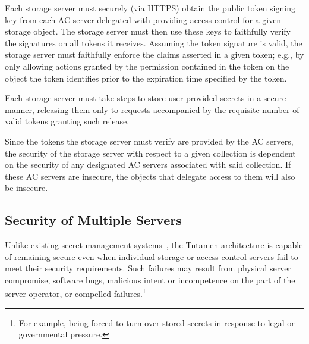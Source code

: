 \begin{packed_desc}
\item[Token Verification:] Each storage server must securely (via
  HTTPS) obtain the public token signing key from each AC server
  delegated with providing access control for a given storage
  object. The storage server must then use these keys to faithfully
  verify the signatures on all tokens it receives. Assuming the token
  signature is valid, the storage server must faithfully enforce the
  claims asserted in a given token; e.g., by only allowing actions
  granted by the permission contained in the token on the object the
  token identifies prior to the expiration time specified by the
  token.
\item[Secure Storage:] Each storage server must take steps to store
  user-provided secrets in a secure manner, releasing them only to
  requests accompanied by the requisite number of valid tokens
  granting such release.
\end{packed_desc}

Since the tokens the storage server must verify are provided by the AC
servers, the security of the storage server with respect to a given
collection is dependent on the security of any designated AC servers
associated with said collection. If these AC servers are insecure, the
objects that delegate access to them will also be insecure.

\subsection{Security of Multiple Servers}

Unlike existing secret management systems~\cite{vault, confidant,
  keywhiz}, the Tutamen architecture is capable of remaining secure
even when individual storage or access control servers fail to meet
their security requirements. Such failures may result from physical
server compromise, software bugs, malicious intent or incompetence on
the part of the server operator, or compelled failures.\footnote{For
  example, being forced to turn over stored secrets in response to
  legal or governmental pressure.}

